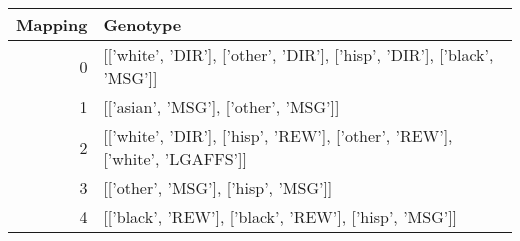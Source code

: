\begin{tabular}{rl}
\toprule
Mapping & Genotype \\
\midrule
0 & [['white', 'DIR'], ['other', 'DIR'], ['hisp', 'DIR'], ['black', 'MSG']] \\
1 & [['asian', 'MSG'], ['other', 'MSG']] \\
2 & [['white', 'DIR'], ['hisp', 'REW'], ['other', 'REW'], ['white', 'LGAFFS']] \\
3 & [['other', 'MSG'], ['hisp', 'MSG']] \\
4 & [['black', 'REW'], ['black', 'REW'], ['hisp', 'MSG']] \\
\bottomrule
\end{tabular}
